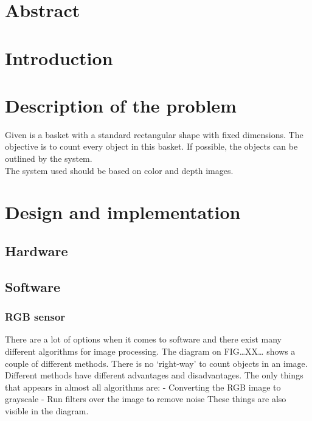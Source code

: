 \documentclass{article}
\begin{document}


\section*{Abstract}
\thispagestyle{empty}

\newpage
\tableofcontents
\thispagestyle{empty}

\newpage
\listoftables
\thispagestyle{empty}

\newpage
\listoffigures
\thispagestyle{empty}

\newpage
\section{Introduction}

\section{Description of the problem}

\hspace{\parindent} Given is a basket with a standard rectangular shape with fixed dimensions. The objective is to count every object in this basket. If possible, the objects can be outlined by the system.\\

\noindent The system used should be based on color and depth images.


\section{Design and implementation}
\subsection{Hardware}
\subsection{Software}
\subsubsection{RGB sensor}

There are a lot of options when it comes to software and there exist many different algorithms for image processing. The diagram on FIG…XX… shows a couple of different methods. There is no ‘right-way’ to count objects in an image. Different methods have different advantages and disadvantages. The only things that appears in almost all algorithms are:
-	Converting the RGB image to grayscale
-	Run filters over the image to remove noise
These things are also visible in the diagram.
\end{document}
